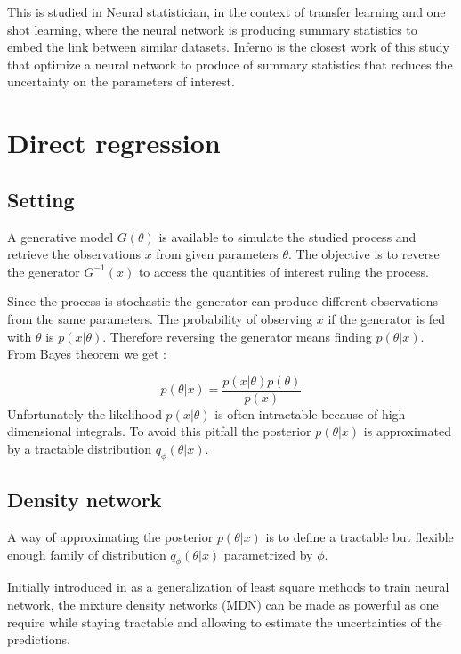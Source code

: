 This is studied in Neural statistician, in the context of transfer learning and one shot learning, where the neural network is producing summary statistics to embed the link between similar datasets.
Inferno is the closest work of this study that optimize a neural network to produce of summary statistics that reduces the uncertainty on the parameters of interest.


\section{Direct regression}

\subsection{Setting}

A generative model $G(\theta)$ is available to simulate the studied process and retrieve the observations $x$ from given parameters $\theta$.
The objective is to reverse the generator $G^{-1}(x)$ to access the quantities of interest ruling the process.

Since the process is stochastic the generator can produce different observations from the same parameters.
The probability of observing $x$ if the generator is fed with $\theta$ is $p(x | \theta)$.
Therefore reversing the generator means finding $p(\theta | x)$.
From Bayes theorem we get :

\begin{equation}
    p(\theta | x) = \frac{p(x | \theta) p(\theta) }{p(x)}
\end{equation}
Unfortunately the likelihood $p(x | \theta)$ is often intractable because of high dimensional integrals.
To avoid this pitfall the posterior $p(\theta | x)$ is approximated by a tractable distribution $q_\phi(\theta | x)$.


\subsection{Density network}


A way of approximating the posterior $p(\theta | x)$ is to define a tractable but flexible enough family of distribution $q_\phi(\theta | x)$ parametrized by $\phi$.

Initially introduced in \cite{Bishop94mixturedensity} as a generalization of least square methods to train neural network, the mixture density networks (MDN) can be made as powerful as one require while staying tractable and allowing to estimate the uncertainties of the predictions.


